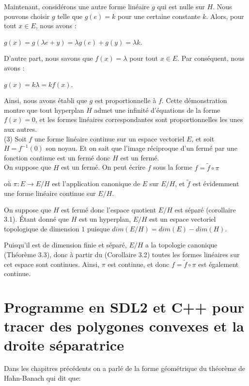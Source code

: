 \documentclass{article}
\theoremstyle{definition}
\theoremstyle{plain}
\begin{document}
Maintenant, considérons une autre forme linéaire $g$ qui est nulle sur $H$. Nous pouvons choisir $g$ telle que $g(e) = k$ pour une certaine constante $k$. Alors, pour tout $x \in E$, nous avons :

$g(x) = g(\lambda e + y) = \lambda g(e) + g(y) = \lambda k$.

D'autre part, nous savons que $f(x) = \lambda$ pour tout $x \in E$. Par conséquent, nous avons :

$g(x) = k \lambda = kf(x)$.

Ainsi, nous avons établi que $g$ est proportionnelle à $f$. Cette démonstration montre que tout hyperplan $H$ admet une infinité d'équations de la forme $f(x) = 0$, et les formes linéaires correspondantes sont proportionnelles les unes aux autres.\\

(3) Soit $f$ une forme linéaire continue sur un espace vectoriel $E$, et soit $H = f^{-1}({0})$ son noyau. 
Et on sait que l'image réciproque d'un fermé par une fonction continue est un fermé
donc $H$ est un fermé.\\

On suppose que $H$ est un fermé.
On peut écrire $f$ sous la forme $f = \tilde{f} \circ \pi$ 

où $\pi : E \rightarrow E/H$ est l'application canonique de $E$ sur $E/H$, et $\tilde{f}$ est évidemment une forme linéaire continue sur $E/H$.

On suppose que $H$ est fermé donc l'espace quotient $E/H$ est séparé (corollaire 3.1). 
Étant donné que $H$ est un hyperplan, $E/H$ est un espace vectoriel topologique 
de dimension $1$ puisque $dim(E/H)=dim(E) - dim(H)$. 

Puisqu'il est de dimension finie et séparé, $E/H$ a la topologie canonique (Théorème 3.3), 
donc à partir du (Corollaire 3.2) toutes les formes linéaires sur cet espace sont continues. 
Ainsi, $\pi$ est continue, et donc $f = \tilde{f} \circ \pi$ est également continue.


\section{Programme en SDL2 et C++ pour tracer des polygones convexes et la droite séparatrice}
Dans les chapitres précédents on a parlé de la forme géométrique du théorème de Hahn-Banach qui dit que:
\end{document}
